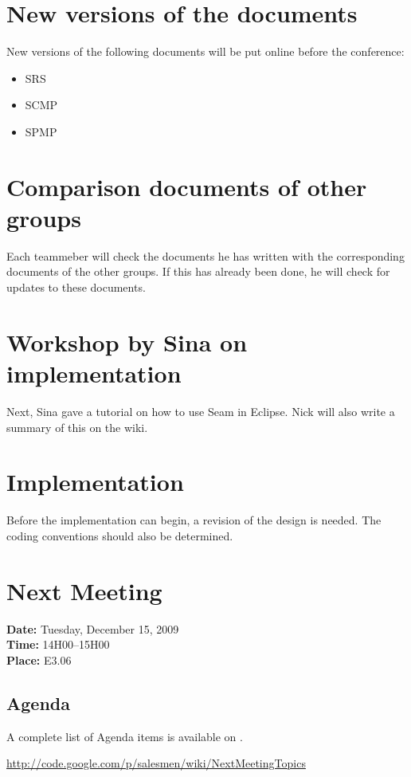 \documentclass[a4paper, 12pt]{article}
\begin{document}
	\section{New versions of the documents}
New versions of the following documents will be put online before the conference:
		\begin{itemize}
			\item SRS
			\item SCMP
			\item SPMP
		\end{itemize}
		
	\section{Comparison documents of other groups}
Each teammeber will check the documents he has written with the corresponding documents of the other groups. If this has already been done, he will check for updates to these documents.

	\section{Workshop by Sina on implementation}
Next, Sina gave a tutorial on how to use Seam in Eclipse. Nick will also write a summary of this on the wiki. 

	\section{Implementation}
Before the implementation can begin, a revision of the design is needed. The coding conventions should also be determined.	
	
	\section{Next Meeting}

		\textbf{Date:} Tuesday, December 15, 2009\\
		\textbf{Time:} 14H00--15H00\\
		\textbf{Place:} E3.06\\
	
		\subsection{Agenda}
A complete list of Agenda items is available on \cite{site6}.\\
	
	\begin{thebibliography}{99}
		\href{http://code.google.com/p/salesmen/wiki/NextMeetingTopics}{http://code.google.com/p/salesmen/wiki/NextMeetingTopics}

		
	\end{thebibliography}	
		
\end{document}
